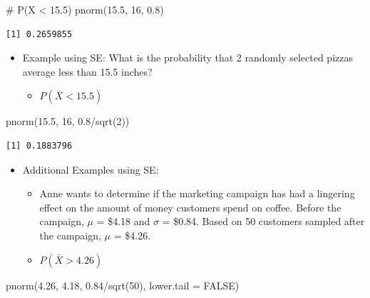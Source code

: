 \documentclass[
  letterpaper,
  DIV=11,
  numbers=noendperiod]{scrreprt}
\newenvironment{Shaded}{\begin{snugshade}}{\end{snugshade}}
\newcommand{\AttributeTok}[1]{\textcolor[rgb]{0.40,0.45,0.13}{#1}}
\newcommand{\CommentTok}[1]{\textcolor[rgb]{0.37,0.37,0.37}{#1}}
\newcommand{\ConstantTok}[1]{\textcolor[rgb]{0.56,0.35,0.01}{#1}}
\newcommand{\DecValTok}[1]{\textcolor[rgb]{0.68,0.00,0.00}{#1}}
\newcommand{\FloatTok}[1]{\textcolor[rgb]{0.68,0.00,0.00}{#1}}
\newcommand{\FunctionTok}[1]{\textcolor[rgb]{0.28,0.35,0.67}{#1}}
\newcommand{\NormalTok}[1]{\textcolor[rgb]{0.00,0.23,0.31}{#1}}
\newcommand{\SpecialCharTok}[1]{\textcolor[rgb]{0.37,0.37,0.37}{#1}}
\providecommand{\tightlist}{%
  \setlength{\itemsep}{0pt}\setlength{\parskip}{0pt}}\usepackage{longtable,booktabs,array}
\begin{document}
\begin{Shaded}
\begin{Highlighting}[]
\CommentTok{\# P(X \textless{} 15.5)}
\FunctionTok{pnorm}\NormalTok{(}\FloatTok{15.5}\NormalTok{, }\DecValTok{16}\NormalTok{, }\FloatTok{0.8}\NormalTok{)}
\end{Highlighting}
\end{Shaded}

\begin{verbatim}
[1] 0.2659855
\end{verbatim}

\begin{itemize}
\tightlist
\item
  Example using SE: What is the probability that 2 randomly selected
  pizzas average less than 15.5 inches?

  \begin{itemize}
  \tightlist
  \item
    \(P(\bar{X} < 15.5)\)
  \end{itemize}
\end{itemize}

\begin{Shaded}
\begin{Highlighting}[]
\FunctionTok{pnorm}\NormalTok{(}\FloatTok{15.5}\NormalTok{, }\DecValTok{16}\NormalTok{, }\FloatTok{0.8}\SpecialCharTok{/}\FunctionTok{sqrt}\NormalTok{(}\DecValTok{2}\NormalTok{))}
\end{Highlighting}
\end{Shaded}

\begin{verbatim}
[1] 0.1883796
\end{verbatim}

\begin{itemize}
\tightlist
\item
  Additional Examples using SE:

  \begin{itemize}
  \tightlist
  \item
    Anne wants to determine if the marketing campaign has had a
    lingering effect on the amount of money customers spend on coffee.
    Before the campaign, \(\mu\) = \$4.18 and \(\sigma\) = \$0.84. Based
    on 50 customers sampled after the campaign, \(\mu\) = \$4.26.
  \item
    \(P(\bar{X} > 4.26)\)
  \end{itemize}
\end{itemize}

\begin{Shaded}
\begin{Highlighting}[]
\FunctionTok{pnorm}\NormalTok{(}\FloatTok{4.26}\NormalTok{, }\FloatTok{4.18}\NormalTok{, }\FloatTok{0.84}\SpecialCharTok{/}\FunctionTok{sqrt}\NormalTok{(}\DecValTok{50}\NormalTok{), }\AttributeTok{lower.tail =} \ConstantTok{FALSE}\NormalTok{)}
\end{Highlighting}
\end{Shaded}
\end{document}
